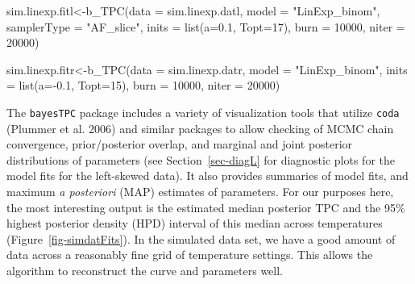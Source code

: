 \documentclass[
]{article}
\newenvironment{Shaded}{\begin{snugshade}}{\end{snugshade}}
\newcommand{\AttributeTok}[1]{\textcolor[rgb]{0.40,0.45,0.13}{#1}}
\newcommand{\DecValTok}[1]{\textcolor[rgb]{0.68,0.00,0.00}{#1}}
\newcommand{\FloatTok}[1]{\textcolor[rgb]{0.68,0.00,0.00}{#1}}
\newcommand{\FunctionTok}[1]{\textcolor[rgb]{0.28,0.35,0.67}{#1}}
\newcommand{\NormalTok}[1]{\textcolor[rgb]{0.00,0.23,0.31}{#1}}
\newcommand{\OtherTok}[1]{\textcolor[rgb]{0.00,0.23,0.31}{#1}}
\newcommand{\SpecialCharTok}[1]{\textcolor[rgb]{0.37,0.37,0.37}{#1}}
\newcommand{\StringTok}[1]{\textcolor[rgb]{0.13,0.47,0.30}{#1}}
\begin{document}
\begin{Shaded}
\begin{Highlighting}[]
\NormalTok{sim.linexp.fitl}\OtherTok{\textless{}{-}}\FunctionTok{b\_TPC}\NormalTok{(}\AttributeTok{data =}\NormalTok{ sim.linexp.datl, }
                      \AttributeTok{model =} \StringTok{"LinExp\_binom"}\NormalTok{, }
                      \AttributeTok{samplerType =} \StringTok{"AF\_slice"}\NormalTok{,}
                      \AttributeTok{inits =} \FunctionTok{list}\NormalTok{(}\AttributeTok{a=}\FloatTok{0.1}\NormalTok{, }\AttributeTok{Topt=}\DecValTok{17}\NormalTok{),}
                      \AttributeTok{burn =} \DecValTok{10000}\NormalTok{,}
                      \AttributeTok{niter =} \DecValTok{20000}\NormalTok{)}

\NormalTok{sim.linexp.fitr}\OtherTok{\textless{}{-}}\FunctionTok{b\_TPC}\NormalTok{(}\AttributeTok{data =}\NormalTok{ sim.linexp.datr, }
                       \AttributeTok{model =} \StringTok{"LinExp\_binom"}\NormalTok{, }
                       \AttributeTok{inits =} \FunctionTok{list}\NormalTok{(}\AttributeTok{a=}\SpecialCharTok{{-}}\FloatTok{0.1}\NormalTok{, }\AttributeTok{Topt=}\DecValTok{15}\NormalTok{),}
                       \AttributeTok{burn =} \DecValTok{10000}\NormalTok{,}
                       \AttributeTok{niter =} \DecValTok{20000}\NormalTok{)}
\end{Highlighting}
\end{Shaded}

The \texttt{bayesTPC} package includes a variety of visualization tools
that utilize \texttt{coda} (Plummer et al. 2006) and similar packages to
allow checking of MCMC chain convergence, prior/posterior overlap, and
marginal and joint posterior distributions of parameters (see
Section~\ref{sec-diagL} for diagnostic plots for the model fits for the
left-skewed data). It also provides summaries of model fits, and maximum
\emph{a posteriori} (MAP) estimates of parameters. For our purposes
here, the most interesting output is the estimated median posterior TPC
and the 95\% highest posterior density (HPD) interval of this median
across temperatures (Figure~\ref{fig-simdatFits}). In the simulated data
set, we have a good amount of data across a reasonably fine grid of
temperature settings. This allows the algorithm to reconstruct the curve
and parameters well.
\end{document}
